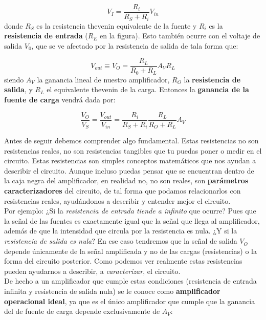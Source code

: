 \documentclass[12pt,a4paper]{article}
\numberwithin{equation}{section}
\numberwithin{figure}{section}
\begin{document}
\begin{equation}
 V_I = \dfrac{R_i}{R_S + R_i} V_{in}
\end{equation}
donde $R_S$ es la resistencia thevenin equivalente de la fuente y $R_i$ es la \textbf{resistencia de entrada} ($R_E$ en la figura). Esto también ocurre con el voltaje de salida $V_0$, que se ve afectado por la resistencia de salida de tala forma que:

\begin{equation}
V_{out} \equiv V_O = \dfrac{R_L}{R_0 + R_L} A_V R_L
\end{equation}
siendo $A_V$ la ganancia lineal de nuestro amplificador, $R_O$ la \textbf{resistencia de salida}, y $R_L$ el equivalente thevenin de la carga. Entonces la \textbf{ganancia de la fuente de carga} vendrá dada por:

\begin{equation}
\dfrac{V_O}{V_S} = \dfrac{V_{out}}{V_{in}} = \dfrac{R_{i}}{R_S + R_i} \dfrac{R_L}{R_O + R_L} A_V
\end{equation}

Antes de seguir debemos comprender algo fundamental. Estas resistencias no son resistencias reales, no son resistencias tangibles que tu puedas poner o medir en el circuito. Estas resistencias son simples conceptos matemáticos que nos ayudan a describir el circuito. Aunque incluso puedas pensar que se encuentran dentro de la caja negra del amplificador, en realidad no, no son reales, son \textbf{parámetros caracterizadores} del circuito, de tal forma que podamos relacionarlos con resistencias reales, ayudándonos a describir y entender mejor el circuito. \\

Por ejemplo: ¿Si la \textit{resistencia de entrada tiende a infinito} que ocurre? Pues que la señal de las fuentes es exactamente igual que la señal que llega al amplificador, además de que la intensidad que circula por la resistencia es nula. ¿Y si la \textit{resistencia de salida es nula}? En ese caso tendremos que la señal de salida $V_O$ depende únicamente de la señal amplificada y no de las cargas (resistencias) o la forma del circuito posterior. Como podemos ver realmente estas resistencias pueden ayudarnos a describir, a \textit{caracterizar}, el circuito. \\

De hecho a un amplificador que cumple estas condiciones (resistencia de entrada infinita y resistencia de salida nula) se le conoce como \textbf{amplificador operacional ideal}, ya que es el único amplificador que cumple que la ganancia del de fuente de carga depende exclusivamente de $A_V$: 
\end{document}
